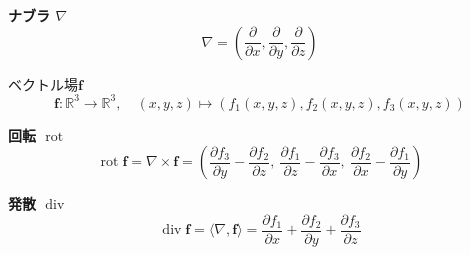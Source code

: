 \documentclass[12pt,b5paper]{ltjsarticle}
\newcommand{\Rot}{\mathop{\mathrm{rot}}\nolimits}
\newcommand{\Div}{\mathop{\mathrm{div}}\nolimits}
\begin{document}
\hrulefill

\textbf{ナブラ $\nabla$}
\begin{equation}
 \nabla = \left( \frac{\partial}{\partial x}, \frac{\partial}{\partial y}, \frac{\partial}{\partial z} \right)
\end{equation}


ベクトル場$\bm{f}$
\begin{equation}
 \bm{f}: \mathbb{R}^3 \rightarrow \mathbb{R}^3,
  \quad
  (x,y,z) \mapsto ( f_1(x,y,z),f_2(x,y,z),f_3(x,y,z) )
\end{equation}


\textbf{回転 $\Rot$}
\begin{equation}
 \Rot \bm{f} = \nabla\times\bm{f}
  = \left(
     \frac{\partial f_3}{\partial y} - \frac{\partial f_2}{\partial z},\
     \frac{\partial f_1}{\partial z} - \frac{\partial f_3}{\partial x},\
     \frac{\partial f_2}{\partial x} - \frac{\partial f_1}{\partial y}
    \right)
\end{equation}


\textbf{発散 $\Div$}
\begin{equation}
 \Div \bm{f} = \langle \nabla, \bm{f}\rangle
  = \frac{\partial f_1}{\partial x}
    + \frac{\partial f_2}{\partial y}
    + \frac{\partial f_3}{\partial z}
\end{equation}
\end{document}
